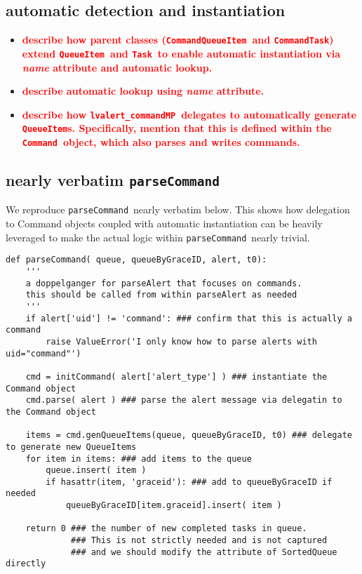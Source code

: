\documentclass{article}
\newcommand{\FIXME}[1]{\textcolor{red}{\textbf{#1}}}
\newcommand{\lvalertCommandMP}{\texttt{lvalert\_commandMP}}
\newcommand{\parseCommand}{\texttt{parseCommand}}
\newcommand{\QueueItem}{\texttt{QueueItem}}
\newcommand{\Task}{\texttt{Task}}
\newcommand{\Command}{\texttt{Command}}
\newcommand{\CommandQueueItem}{\texttt{CommandQueueItem}}
\newcommand{\CommandTask}{\texttt{CommandTask}}
\begin{document}

\subsection{automatic detection and instantiation}
\label{sec: automatic detection and instantiation}

\begin{itemize}
    \item{\FIXME{describe how parent classes (\CommandQueueItem~and \CommandTask) extend \QueueItem~and \Task~to enable automatic instantiation via \textit{name} attribute and automatic lookup.}}
    \item{\FIXME{describe automatic lookup using \textit{name} attribute.}}
    \item{\FIXME{describe how \lvalertCommandMP~delegates to automatically generate {\QueueItem}s. Specifically, mention that this is defined within the \Command~object, which also parses and writes commands.}}
\end{itemize}


\subsection{nearly verbatim \parseCommand}
\label{sec: verbatim parseCommand}

We reproduce \parseCommand~nearly verbatim below.
This shows how delegation to Command objects coupled with automatic instantiation can be heavily leveraged to make the actual logic within \parseCommand~nearly trivial.

\begin{verbatim}
def parseCommand( queue, queueByGraceID, alert, t0):
    '''
    a doppelganger for parseAlert that focuses on commands.
    this should be called from within parseAlert as needed
    '''
    if alert['uid'] != 'command': ### confirm that this is actually a command
        raise ValueError('I only know how to parse alerts with uid="command"')

    cmd = initCommand( alert['alert_type'] ) ### instantiate the Command object
    cmd.parse( alert ) ### parse the alert message via delegatin to the Command object

    items = cmd.genQueueItems(queue, queueByGraceID, t0) ### delegate to generate new QueueItems
    for item in items: ### add items to the queue
        queue.insert( item )
        if hasattr(item, 'graceid'): ### add to queueByGraceID if needed
            queueByGraceID[item.graceid].insert( item )

    return 0 ### the number of new completed tasks in queue. 
             ### This is not strictly needed and is not captured 
             ### and we should modify the attribute of SortedQueue directly
\end{verbatim}




\end{document}
